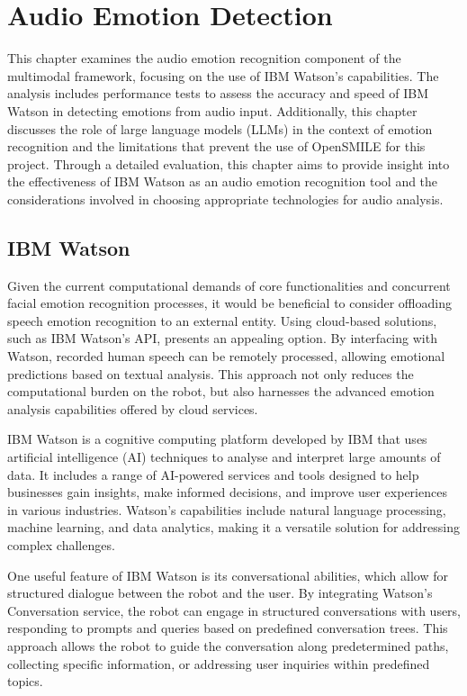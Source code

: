 \chapter{Audio Emotion Detection}

This chapter examines the audio emotion recognition component of the multimodal framework, focusing on the use of IBM Watson's capabilities. The analysis includes performance tests to assess the accuracy and speed of IBM Watson in detecting emotions from audio input. Additionally, this chapter discusses the role of large language models (LLMs) in the context of emotion recognition and the limitations that prevent the use of OpenSMILE for this project. Through a detailed evaluation, this chapter aims to provide insight into the effectiveness of IBM Watson as an audio emotion recognition tool and the considerations involved in choosing appropriate technologies for audio analysis.

\section{IBM Watson}

Given the current computational demands of core functionalities and concurrent facial emotion recognition processes, it would be beneficial to consider offloading speech emotion recognition to an external entity. Using cloud-based solutions, such as IBM Watson's API, presents an appealing option. By interfacing with Watson, recorded human speech can be remotely processed, allowing emotional predictions based on textual analysis. This approach not only reduces the computational burden on the robot, but also harnesses the advanced emotion analysis capabilities offered by cloud services.

IBM Watson is a cognitive computing platform developed by IBM that uses artificial intelligence (AI) techniques to analyse and interpret large amounts of data. It includes a range of AI-powered services and tools designed to help businesses gain insights, make informed decisions, and improve user experiences in various industries. Watson's capabilities include natural language processing, machine learning, and data analytics, making it a versatile solution for addressing complex challenges.

One useful feature of IBM Watson is its conversational abilities, which allow for structured dialogue between the robot and the user. By integrating Watson's Conversation service, the robot can engage in structured conversations with users, responding to prompts and queries based on predefined conversation trees. This approach allows the robot to guide the conversation along predetermined paths, collecting specific information, or addressing user inquiries within predefined topics.

